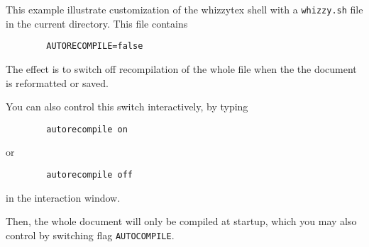 \documentclass{article}
\begin{document}
This example illustrate customization of the whizzytex shell with a
\texttt{whizzy.sh} file in the current directory. This file contains
\begin{verbatim}
        AUTORECOMPILE=false
\end{verbatim}
The effect is to switch off recompilation of the whole file when the
the document is reformatted or saved. 

You can also control this switch interactively, by typing
\begin{verbatim}
        autorecompile on
\end{verbatim}
or
\begin{verbatim}
        autorecompile off
\end{verbatim}
in the interaction window. 

Then, the whole document will only be compiled at startup, which you may
also control by switching flag \texttt{AUTOCOMPILE}. 
\end{document}
